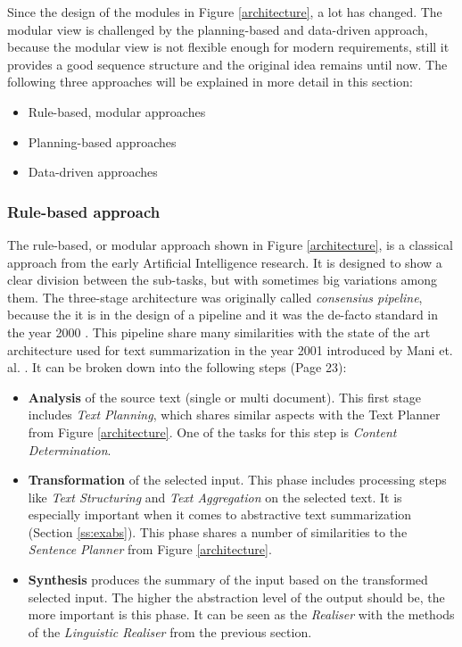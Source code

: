 Since the design of the modules in Figure \ref{architecture}, a lot has changed. The modular view is challenged by the planning-based and data-driven approach, because the modular view is not flexible enough for modern requirements, still it provides a good sequence structure and the original idea remains until now. The following three approaches will be explained in more detail in this section:

\begin{itemize}
	\item Rule-based, modular approaches
	\item Planning-based approaches
	\item Data-driven approaches
\end{itemize}

\subsubsection{Rule-based approach}

The rule-based, or modular approach shown in Figure \ref{architecture}, is a classical approach from the early Artificial Intelligence research. It is designed to show a clear division between the sub-tasks, but with sometimes big variations among them. The three-stage architecture was originally called \textit{consensius pipeline}, because the it is in the design of a pipeline and it was the de-facto standard in the year 2000 \cite{reiter2}. This pipeline share many similarities with the state of the art architecture used for text summarization in the year 2001 introduced by Mani et. al. \cite{mani}. It can be broken down into the following steps \cite{gatt} (Page 23):

\begin{itemize}
	\item \textbf{Analysis} of the source text (single or multi document). This first stage includes \textit{Text Planning}, which shares similar aspects with the Text Planner from Figure \ref{architecture}. One of the tasks for this step is \textit{Content Determination}.
	\item \textbf{Transformation} of the selected input. This phase includes processing steps like \textit{Text Structuring} and \textit{Text Aggregation} on the selected text. It is especially important when it comes to abstractive text summarization (Section \ref{ss:exabs}). This phase shares a number of similarities to the \textit{Sentence Planner} from Figure \ref{architecture}.
	\item \textbf{Synthesis} produces the summary of the input based on the transformed selected input. The higher the abstraction level of the output should be, the more important is this phase. It can be seen as the \textit{Realiser} with the methods of the \textit{Linguistic Realiser} from the previous section.
\end{itemize}

